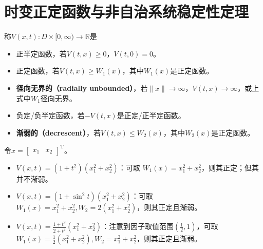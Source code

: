 \section{时变正定函数与非自治系统稳定性定理}\label{3Cref}
\begin{definition}
称$V(x,t): D \times [0, \infty) \rightarrow \mathbb{R}$是
    \begin{itemize}[leftmargin=1em]
      \item 正半定函数，若$V(t,x)\ge 0$，$V(t,0)=0$。
      \item 正定函数，若$V(t,x)\ge W_1(x)$，其中$W_1(x)$是正定函数。
      \item {\bf 径向无界的（radially unbounded）}，若$\|x\|\to\infty$，$V(t,x)\to \infty$，或上式中$W_1$径向无界。
      \item 负定/负半定函数，若$-V(t,x)$是正定/正半定函数。
      \item {\bf 渐弱的（decrescent）}，若$V(t,x)\le W_2(x)$，其中$W_2(x)$是正定函数。
    \end{itemize}
\end{definition}
\newpage
\begin{example}[正定与渐弱]
    令$x = [\begin{array}{cc}
    x_1& x_2
  \end{array}]^\mathrm{T}$。
  \begin{itemize}[leftmargin=1em]
    \item $V (x, t) = (1 + t^2) (x^2_1 + x_2^2)$：可取 $W_1 (x) = x^2_1 +
    x^2_2$，则其正定；但其并不渐弱。
    
    \item $V (x, t) = (1 + \sin^2 t) (x^2_1 + x_2^2)$：可取$W_1 (x) = x^2_1 +
    x^2_2, W_2 = 2 (x^2_1 + x^2_2)$，则其正定且渐弱。
    
    \item $V (x, t) = \frac{1 + t^2}{2 + t^2} (x^2_1 + x_2^2)$：注意到因子取值范围$(\frac12,1)$，可取 $W_1 (x)
    = \frac{1}{2} (x^2_1 + x^2_2), W_2 = x^2_1 + x^2_2$，则其正定且渐弱。
  \end{itemize}
\end{example}

